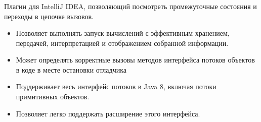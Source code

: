 \begin{frame}
\frametitle{\insertsection} 
\framesubtitle{\insertsubsection}
Плагин для IntelliJ IDEA, позволяющий посмотреть промежуточные состояния и переходы в цепочке вызовов. 
\begin{itemize}
	\item Позволяет выполнять запуск вычислений с эффективным хранением, передачей, интерпретацией и отображением собранной информации.
	\item Может определять корректные вызовы методов интерфейса потоков объектов в коде в месте остановки отладчика
	\item Поддерживает весь интерфейс потоков в Java 8, включая потоки примитивных объектов.
	\item Позволяет легко поддержать расширение этого интерфейса.
\end{itemize}
\end{frame}
 